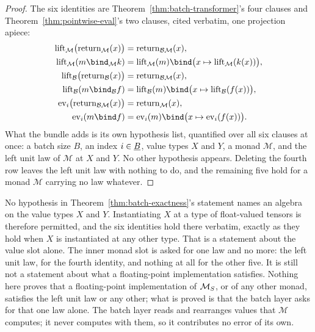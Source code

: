 \begin{proof}
\leanok
The six identities are Theorem~\ref{thm:batch-transformer}'s four
clauses and Theorem~\ref{thm:pointwise-eval}'s two clauses, cited
verbatim, one projection apiece:
\begin{align*}
  \mathrm{lift}_{\mathcal M}\bigl(\Ret_{\mathcal M}(x)\bigr)
    &= \Ret_{\Bmon\mathcal M}(x), \\
  \mathrm{lift}_{\mathcal M}(m \bind_{\mathcal M} k)
    &= \mathrm{lift}_{\mathcal M}(m) \bind
       \bigl(x \mapsto \mathrm{lift}_{\mathcal M}(k(x))\bigr), \\
  \mathrm{lift}_{\Bmon}\bigl(\Ret_{\Bmon}(x)\bigr)
    &= \Ret_{\Bmon\mathcal M}(x), \\
  \mathrm{lift}_{\Bmon}(m \bind_{\Bmon} f)
    &= \mathrm{lift}_{\Bmon}(m) \bind
       \bigl(x \mapsto \mathrm{lift}_{\Bmon}(f(x))\bigr), \\
  \mathrm{ev}_i\bigl(\Ret_{\Bmon\mathcal M}(x)\bigr)
    &= \Ret_{\mathcal M}(x), \\
  \mathrm{ev}_i(m \bind f)
    &= \mathrm{ev}_i(m) \bind \bigl(x \mapsto \mathrm{ev}_i(f(x))\bigr).
\end{align*}
What the bundle adds is its own hypothesis list, quantified over all
six clauses at once: a batch size $B$, an index $i \in \underline B$, value
types $X$ and $Y$, a monad $\mathcal M$, and the left unit law of
$\mathcal M$ at $X$ and $Y$. No other hypothesis appears. Deleting the
fourth row leaves the left unit law with nothing to do, and the
remaining five hold for a monad $\mathcal M$ carrying no law whatever.
\end{proof}

No hypothesis in Theorem~\ref{thm:batch-exactness}'s statement names an
algebra on the value types $X$ and $Y$. Instantiating $X$ at a type of
float-valued tensors is therefore permitted, and the six identities
hold there verbatim, exactly as they hold when $X$ is instantiated at
any other type. That is a statement about the value slot alone. The
inner monad slot is asked for one law and no more: the left unit law,
for the fourth identity, and nothing at all for the other five. It is
still not a statement about what a floating-point implementation
satisfies. Nothing here proves that a floating-point implementation of
$\mathcal M_{S}$, or of any other monad, satisfies the left unit law or any
other; what is proved is that the batch layer asks for that one law
alone. The batch
layer reads and rearranges values that $\mathcal M$ computes; it never
computes with them, so it contributes no error of its own.

